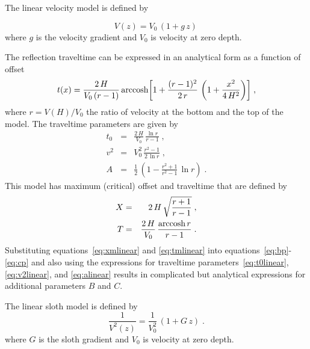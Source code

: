 


The linear velocity model is defined by 

\begin{equation}
\label{eq:linear}
V(z) = V_0\,(1+g\,z)\,
\end{equation}
where $g$ is the velocity gradient and $V_0$ is velocity at zero depth.

The reflection traveltime can be expressed in an analytical form as a
function of offset \cite[]{LSC00-00-02680268}
\begin{equation}
  t(x) = {\frac{2\,H}{V_0\,(r-1)}}\,
  {\mbox{arccosh}{\left[1 + \frac{(r-1)^2}{2\,r}\,\left(1+\frac{x^2}{4\,H^2}\right)\right]}}\;,
  \label{eq:tlinear}
\end{equation}
where  $r=V(H)/V_0$  
the ratio of velocity at the bottom and the top of the model. The
traveltime parameters are given by
\begin{eqnarray}
  \label{eq:t0linear}
  t_0 & = & \frac{2\,H}{V_0}\,\frac{\ln{r}}{r-1}\;, \\
  \label{eq:v2linear}
  v^2 & = & V_0^2\,\frac{r^2-1}{2\,\ln{r}}\;, \\
  \label{eq:alinear}
  A & = & \frac{1}{2}\,\left(1-\frac{r^2+1}{r^2-1}\,\ln{r}\right)\;.
\end{eqnarray}
This model has maximum (critical) offset and traveltime that are
defined by
\begin{eqnarray}
  \label{eq:xmlinear}
  X & = & 2\,H\,\sqrt{\frac{r+1}{r-1}}\;, \\
  \label{eq:tmlinear}
  T & = & \frac{2\,H}{V_0}\,\frac{\mbox{arccosh}\,{r}}{r-1}\;.
\end{eqnarray}
Substituting equations~\ref{eq:xmlinear} and \ref{eq:tmlinear} into
equations~\ref{eq:bp}-\ref{eq:cp} and also using the expressions for
traveltime parameters~\ref{eq:t0linear}, \ref{eq:v2linear}, and
\ref{eq:alinear} results in complicated but analytical expressions for
additional parameters $B$ and $C$.


The linear sloth model is defined by 
\begin{equation}
  {\frac{1}{V^2(z)}} = {\frac{1}{V_0^2}}\,(1+G\,z)\;.
  \label{eq:sloth}
\end{equation}
where $G$ is the sloth gradient and $V_0$ is velocity at zero depth.

